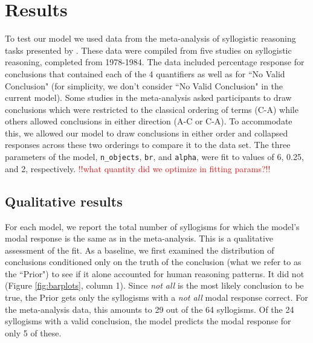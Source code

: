 \documentclass[10pt,letterpaper]{article}
\newcommand{\red}[1]{\textcolor{Red}{#1}}
\begin{document}
\section{Results}

To test our model we used data from the meta-analysis of syllogistic reasoning tasks presented by . These data were compiled from five studies on syllogistic reasoning, completed from 1978-1984. The data included percentage response for conclusions that contained each of the 4 quantifiers as well as for ``No Valid Conclusion" (for simplicity, we don't consider ``No Valid Conclusion" in the current model). Some studies in the meta-analysis asked participants to draw conclusions which were restricted to the classical ordering of terms (C-A) while others allowed conclusions in either direction (A-C or C-A). To accommodate this, we allowed our model to draw conclusions in either order and collapsed responses across these two orderings to compare it to the data set.
%
The three parameters of the model, \lstinline{n_objects}, \lstinline{br}, and \lstinline{alpha}, were fit to values of 6, 0.25, and 2, respectively.
\red{!!what quantity did we optimize in fitting params?!!}

\subsection{Qualitative results}
For each model, we report the total number of syllogisms for which the model's modal response is the same as in the meta-analysis. This is a qualitative assessment of the fit. 
As a baseline, we first examined the distribution of conclusions conditioned only on the truth of the conclusion (what we refer to as the ``Prior") to see if it alone accounted for human reasoning patterns. It did not (Figure \ref{fig:barplots}, column 1). Since \emph{not all} is the most likely conclusion to be true, the Prior gets only the syllogisms with a \emph{not all} modal response correct. For the meta-analysis data, this amounts to 29 out of the 64 syllogisms. Of the 24 syllogisms with a valid conclusion, the model predicts the modal response for only 5 of these.
\end{document}
